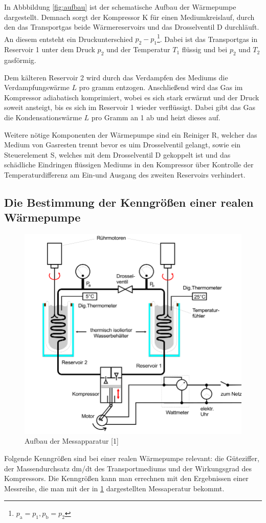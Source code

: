 In Abbbildung \ref{fig:aufbau} ist der schematische Aufbau der Wärmepumpe dargestellt.
Demnach sorgt der Kompressor K für einen Mediumkreislauf, durch den das Transportgas beide Wärmereservoirs und das Drosselventil D durchläuft.
An diesem entsteht ein Druckunterschied $p_2-p_1$\footnote{$p_\text{a}=p_1, p_\text{b}=p_2$}. Dabei ist das Transportgas in Reservoir 1 unter dem Druck $p_2$
und der Temperatur $T_1$ flüssig und bei $p_2$ und $T_2$ gasförmig.

Dem kälteren Reservoir 2 wird durch das Verdampfen des Mediums die Verdampfungswärme $L$ pro gramm entzogen. 
Anschließend wird das Gas im Kompressor adiabatisch komprimiert, wobei es sich stark erwärmt und der Druck soweit ansteigt, bis es sich im Reservoir 1
wieder verflüssigt. Dabei gibt das Gas die Kondensationswärme $L$ pro Gramm an 1 ab und heizt dieses auf.

Weitere nötige Komponenten der Wärmepumpe sind ein Reiniger R, welcher das Medium von Gasresten trennt bevor es uim Drosselventil gelangt, sowie ein Steuerelement S,
welches mit dem Drosselventil D gekoppelt ist und das schädliche Eindringen flüssigen Mediums in den Kompressor über Kontrolle der Temperaturdifferenz
am Ein-und Ausgang des zweiten Reservoirs verhindert. 
\subsection{Die Bestimmung der Kenngrößen einer realen Wärmepumpe}
\begin{figure}
    \centering
    \includegraphics[scale=0.5]{aufbau2.pdf}
    \caption{Aufbau der Messapparatur [1]}
    \label{fig:aufbau2}
\end{figure}
Folgende Kenngrößen sind bei einer realen Wärmepumpe relevant: die Güteziffer, der Massendurchsatz dm/dt des Transportmediums und der Wirkungsgrad des Kompressors. Die Kenngrößen kann man errechnen mit den 
Ergebnissen einer Messreihe, die man mit der in \ref{fig:aufbau2} dargestellten Messaperatur bekommt.

